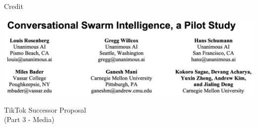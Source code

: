 \documentclass[aspectratio=169]{beamer}
\begin{document}
\begin{frame}{Credit}
\vspace{-0.5in}
\begin{center}
\includegraphics[width=\textwidth]{imgs/CSI_section/authors.png}
\end{center}
\end{frame}

\begin{frame}
    \centering
    \Huge TikTok Successor Proposal \\
    \Huge (Part 3 - Media)
\end{frame}
\end{document}
